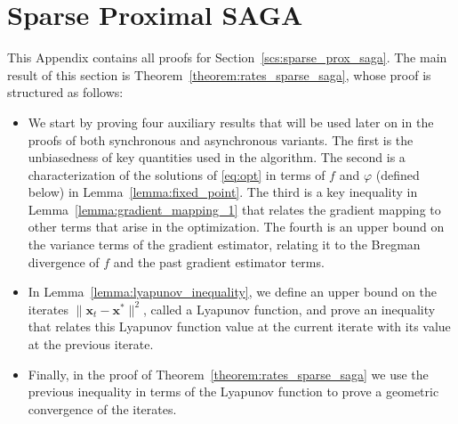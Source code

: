 \documentclass{article}
\def\xx{{\boldsymbol x}}
\begin{document}
\clearpage
\section{Sparse Proximal SAGA}\label{apx:sparse_saga}

\vspace{0.5em}

This Appendix contains all proofs for Section~\ref{scs:sparse_prox_saga}. The main result of this section is Theorem~\ref{theorem:rates_sparse_saga}, whose proof is structured as follows:
\begin{itemize}
\item We start by proving four auxiliary results that will be used later on in the proofs of both  synchronous and asynchronous variants. 
The first is the unbiasedness of key quantities used in the algorithm. 
The second is a characterization of the solutions of \eqref{eq:opt} in terms of $f$ and $\varphi$ (defined below) in Lemma~\ref{lemma:fixed_point}.
The third is a key inequality in Lemma~\ref{lemma:gradient_mapping_1} that relates the gradient mapping to other terms that arise in the optimization.
The fourth is an upper bound on the variance terms of the gradient estimator, relating it to the Bregman divergence of $f$ and the past gradient estimator terms.
\item In Lemma~\ref{lemma:lyapunov_inequality}, we define an upper bound on the iterates $\|\xx_t - \xx^*\|^2$, called a Lyapunov function, and prove an inequality that relates this Lyapunov function value at the current iterate with its value at the previous iterate.
\item Finally, in the proof of Theorem~\ref{theorem:rates_sparse_saga} we use the previous inequality in terms of the Lyapunov function to prove a geometric convergence of the iterates.
\end{itemize}

% 
\end{document}
